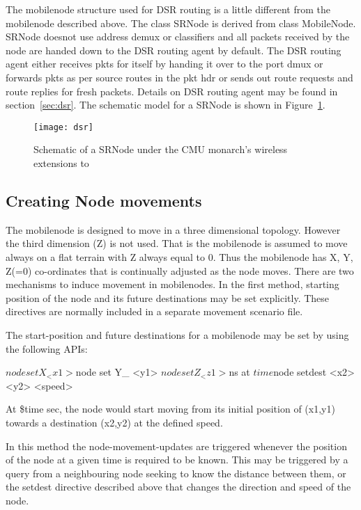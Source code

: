 The mobilenode structure used for DSR routing is a little different from the mobilenode described above. The class SRNode is derived from class MobileNode. SRNode doesnot use address demux or classifiers and all packets received by the node are handed down to the DSR routing agent by default. The DSR routing agent either receives pkts for itself by handing it over to the port dmux or forwards pkts as per source routes in the pkt hdr or sends out route requests and route replies for fresh packets. Details on DSR routing agent may be found in section~\ref{sec:dsr}. The schematic model for a SRNode is shown in Figure~\ref{fig:mobilenode-dsr}.
\begin{figure}[tb]
    \centerline{\texttt{[image: dsr]}}
    \caption{Schematic of a SRNode under the CMU monarch's wireless extensions to \ns}
    \label{fig:mobilenode-dsr}
\end{figure}

\subsection{Creating Node movements}
\label{sec:mobilenode-movements}

The mobilenode is designed to move in a three dimensional topology. However the third dimension (Z) is not used. That is the mobilenode is assumed to move always on a flat terrain with Z always equal to 0.
Thus the mobilenode has X, Y, Z(=0) co-ordinates that is continually adjusted as the node moves. There are two mechanisms to induce movement in mobilenodes. 
In the first method, starting position of the node and its future destinations may be set explicitly. These directives are normally included in a separate movement scenario file. 

The start-position and future destinations for a mobilenode may be set by using the following APIs:

\begin{program}

$node set X_ <x1>
$node set Y_ <y1>
$node set Z_ <z1>

$ns at $time $node setdest <x2> <y2> <speed>
\end{program}
At \$time sec, the node would start moving from its initial position 
of (x1,y1) towards a destination (x2,y2) at the defined speed.

In this method the node-movement-updates are triggered whenever the position of the node at a given time is required to be known. This may be triggered by a query from a neighbouring node seeking to know the distance between them, or the setdest directive described above that changes the direction and speed of the node.

